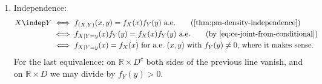 \begin{remark}
\begin{enumerate}[label=\arabic*),leftmargin=*]
\begin{itemize}
\[\begin{aligned}
          \end{aligned}
        \]
        so $f_{(X,Y)}(x,y)\1_{D^c}(y)=0$ a.e.\ (\cref{prop:in-ae}), that is,
        $f_{(X,Y)}(x,y)=0$ for a.e.\ $(x,y)$ with $x\in\mathbb R$, $y\in D^c$. There the right-hand
        side of \eqref{eq:ce-joint-from-conditional} is $0$ too ($f_{X\mid Y=y}$ is defined,
        even if arbitrarily).
    \end{itemize}
  \item Independence:
    \[
    \begin{aligned}
      X\indep Y&\iff f_{(X,Y)}(x,y)=f_X(x)f_Y(y)\ \text{a.e.}
        \qquad\text{(\cref{thm:pm-density-independence})}\\
      &\iff f_{X\mid Y=y}(x)f_Y(y)=f_X(x)f_Y(y)\ \text{a.e.}
        \qquad\text{(by \eqref{eq:ce-joint-from-conditional})}\\
      &\iff f_{X\mid Y=y}(x)=f_X(x)\ \text{for a.e.\ $(x,y)$ with $f_Y(y)\ne0$, where it makes sense.}
    \end{aligned}
    \]
    For the last equivalence: on $\mathbb R\times D^c$ both sides of the previous line vanish,
    and on $\mathbb R\times D$ we may divide by $f_Y(y)>0$.
\end{enumerate}
\end{remark}

